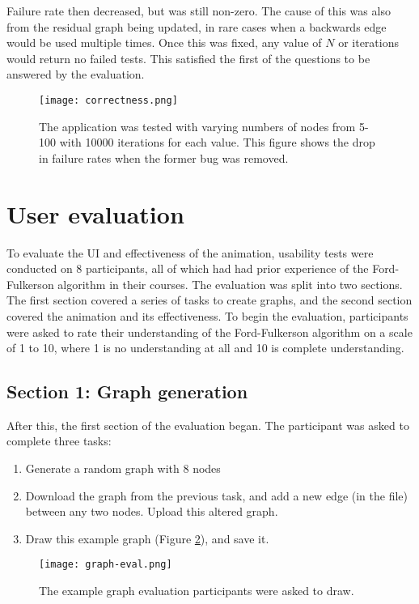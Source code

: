 \documentclass{l4proj}
\begin{document}
Failure rate then decreased, but was still non-zero. The cause of this was also from the residual graph being updated, in rare cases when a backwards edge would be used multiple times. Once this was fixed, any value of $N$ or iterations would return no failed tests. This satisfied the first of the questions to be answered by the evaluation.

\begin{figure}[h]
    \centering
    \texttt{[image: correctness.png]}
    \caption{The application was tested with varying numbers of nodes from 5-100 with 10000 iterations for each value. This figure shows the drop in failure rates when the former bug was removed.}
    \label{fig:my_label}
\end{figure}

\section{User evaluation}
To evaluate the UI and effectiveness of the animation, usability tests were conducted on 8 participants, all of which had had prior experience of the Ford-Fulkerson algorithm in their courses. The evaluation was split into two sections. The first section covered a series of tasks to create graphs, and the second section covered the animation and its effectiveness. To begin the evaluation, participants were asked to rate their understanding of the Ford-Fulkerson algorithm on a scale of 1 to 10, where 1 is no understanding at all and 10 is complete understanding.

\subsection{Section 1: Graph generation}
After this, the first section of the evaluation began. The participant was asked to complete three tasks:
\begin{enumerate}
    \item Generate a random graph with 8 nodes
    \item Download the graph from the previous task, and add a new edge (in the file) between any two nodes. Upload this altered graph.
    \item Draw this example graph (Figure \ref{fig:eval-graph}), and save it.
\end{enumerate}

\begin{figure}[h]
    \centering
    \texttt{[image: graph-eval.png]}
    \caption{The example graph evaluation participants were asked to draw.}
    \label{fig:eval-graph}
\end{figure}
\end{document}

